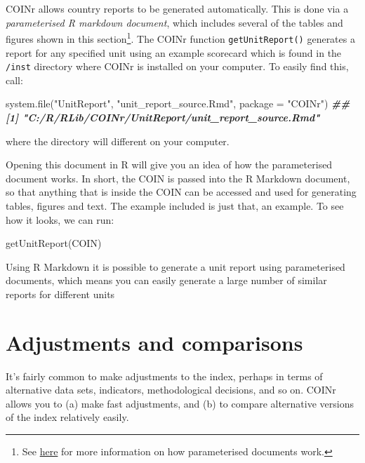 \documentclass[
]{book}
\newenvironment{Shaded}{\begin{snugshade}}{\end{snugshade}}
\newcommand{\AttributeTok}[1]{\textcolor[rgb]{0.77,0.63,0.00}{#1}}
\newcommand{\DocumentationTok}[1]{\textcolor[rgb]{0.56,0.35,0.01}{\textbf{\textit{#1}}}}
\newcommand{\FunctionTok}[1]{\textcolor[rgb]{0.00,0.00,0.00}{#1}}
\newcommand{\NormalTok}[1]{#1}
\newcommand{\StringTok}[1]{\textcolor[rgb]{0.31,0.60,0.02}{#1}}
\begin{document}
COINr allows country reports to be generated automatically. This is done via a \emph{parameterised R markdown document}, which includes several of the tables and figures shown in this section\footnote{See \href{https://bookdown.org/yihui/rmarkdown/parameterized-reports.html}{here} for more information on how parameterised documents work.}. The COINr function \texttt{getUnitReport()} generates a report for any specified unit using an example scorecard which is found in the \texttt{/inst} directory where COINr is installed on your computer. To easily find this, call:

\begin{Shaded}
\begin{Highlighting}[]
\FunctionTok{system.file}\NormalTok{(}\StringTok{"UnitReport"}\NormalTok{, }\StringTok{"unit\_report\_source.Rmd"}\NormalTok{, }\AttributeTok{package =} \StringTok{"COINr"}\NormalTok{)}
\DocumentationTok{\#\# [1] "C:/R/RLib/COINr/UnitReport/unit\_report\_source.Rmd"}
\end{Highlighting}
\end{Shaded}

where the directory will different on your computer.

Opening this document in R will give you an idea of how the parameterised document works. In short, the COIN is passed into the R Markdown document, so that anything that is inside the COIN can be accessed and used for generating tables, figures and text. The example included is just that, an example. To see how it looks, we can run:

\begin{Shaded}
\begin{Highlighting}[]
\FunctionTok{getUnitReport}\NormalTok{(COIN)}
\end{Highlighting}
\end{Shaded}

Using R Markdown it is possible to generate a unit report using parameterised documents, which means you can easily generate a large number of similar reports for different units

\hypertarget{adjustments-and-comparisons}{%
\chapter{Adjustments and comparisons}\label{adjustments-and-comparisons}}

It's fairly common to make adjustments to the index, perhaps in terms of alternative data sets, indicators, methodological decisions, and so on. COINr allows you to (a) make fast adjustments, and (b) to compare alternative versions of the index relatively easily.
\end{document}
